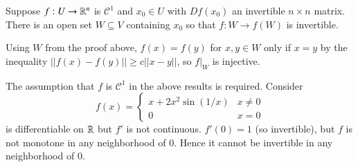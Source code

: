 \begin{cor}
    Suppose $f:U\rightarrow \mathbb R^n$ is $\mathcal{C}^1$ and $x_0 \in U$ with $Df(x_0)$ an invertible $n\times n$ matrix. There is an open set $W \subseteq V$ containing $x_0$ so that $f:W\rightarrow f(W)$ is invertible.
\end{cor}

Using $W$ from the proof above, $f(x) = f(y)$ for $x,y \in W$ only if $x = y$ by the inequality $||f(x) - f(y)|| \geq c||x-y||$, so $f\vert_W$ is injective.

\begin{eg}
    The assumption that $f$ is $\mathcal{C}^1$ in the above results is required. Consider $$f(x) = \left\{\begin{array}{cc} x+2x^2\sin(1/x) & x \neq 0 \\ 0 & x = 0\end{array}\right.$$ is differentiable on $\mathbb R$ but $f'$ is not continuous. $f'(0) = 1$ (so invertible), but $f$ is not monotone in any neighborhood of $0$. Hence it cannot be invertible in any neighborhood of $0$.
\end{eg}

